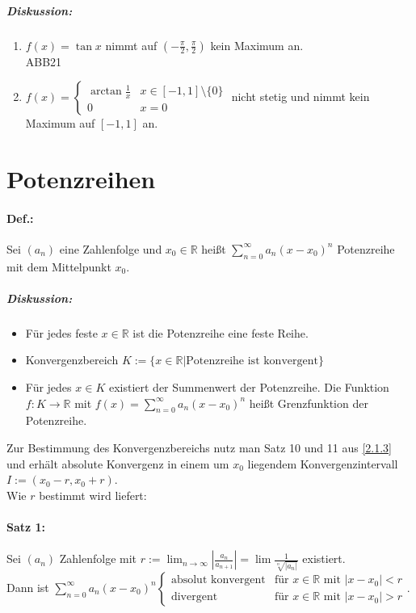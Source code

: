 \subparagraph{Diskussion:}
\begin{enumerate}[label=\alph*.)]
\item $f(x) = \tan x$ nimmt auf $\left( - \frac{\pi}{2}, \frac{\pi}{2}\right)$ kein Maximum an.\\
ABB21
\item $f(x) = \begin{cases}
\arctan \frac{1}{x} & x \in [-1,1]\setminus \{0\}\\
0 & x = 0
\end{cases}$ nicht stetig und nimmt kein Maximum auf $[-1,1]$ an.\\
\end{enumerate}

\section{Potenzreihen}
\paragraph{Def.:} Sei $(a_n)$ eine Zahlenfolge und $x_0 \in \mathbb{R}$ heißt $\boxed{\sum_{n=0}^\infty a_n (x-x_0)^n}$ Potenzreihe mit dem Mittelpunkt $x_0$.
\subparagraph{Diskussion:} 
\begin{itemize}
\item Für jedes feste $x \in \mathbb{R}$ ist die Potenzreihe eine feste Reihe.
\item Konvergenzbereich $K:=\{x\in \mathbb{R} | \text{Potenzreihe ist konvergent}\}$
\item Für jedes $x\in K$ existiert der Summenwert der Potenzreihe. Die Funktion $f: K \to \mathbb{R}$ mit $f(x) = \sum_{n=0}^\infty a_n (x-x_0)^n$ heißt Grenzfunktion der Potenzreihe.
\end{itemize}
Zur Bestimmung des Konvergenzbereichs nutz man Satz 10 und 11 aus \ref{2.1.3} und erhält absolute Konvergenz in einem um $x_0$ liegendem Konvergenzintervall $I:=(x_0-r, x_0+r)$.\\
Wie $r$ bestimmt wird liefert:

\paragraph{Satz 1:} Sei $(a_n)$ Zahlenfolge mit $r:=\lim_{n\to \infty} \left| \frac{a_n}{a_{n+1}}\right|=\lim \frac{1}{\sqrt[n]{|a_n|}}$ existiert.\\
Dann ist $\sum_{n=0}^\infty a_n (x-x_0)^n\begin{cases}
\text{absolut konvergent} & \text{für }x\in \mathbb{R} \text{ mit }|x-x_0|<r\\
\text{divergent} & \text{für }x\in \mathbb{R} \text{ mit }|x-x_0|>r
\end{cases}$.

